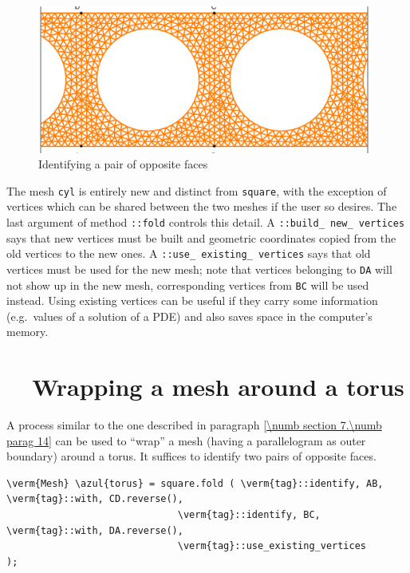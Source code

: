 \begin{figure}[ht] \centering
  \includegraphics[width=110mm]{cylinder-1.eps}
  \caption{Identifying a pair of opposite faces}
  \label{\numb section 7.\numb fig 10}
\end{figure}

The mesh {\small\tt cyl} is entirely new and distinct from {\small\tt square},
with the exception of vertices which can be shared between the two meshes if the
user so desires.
The last argument of method {\small\tt{}::fold} controls this detail.
A {\small\tt{}::build\_\,new\_\,vertices} says that new vertices must be built
and geometric coordinates copied from the old vertices to the new ones.
A {\small\tt{}::use\_\,existing\_\,vertices} says that old vertices must be used
for the new mesh; note that vertices belonging to {\small\tt DA} will not show up in the
new mesh, corresponding vertices from {\small\tt BC} will be used instead.
Using existing vertices can be useful if they carry some information (e.g.\ values
of a solution of a PDE) and also saves space in the computer's memory.


\section{~~Wrapping a mesh around a torus}\label{\numb section 7.\numb parag 15}

A process similar to the one described in paragraph \ref{\numb section 7.\numb parag 14}
can be used to ``wrap'' a mesh (having a parallelogram as outer boundary) around
a torus.
It suffices to identify two pairs of opposite faces.

\begin{Verbatim}[commandchars=\\\{\},formatcom=\small\tt,frame=single,
   label=parag-\ref{\numb section 7.\numb parag 15}.cpp,rulecolor=\color{coment},
   baselinestretch=0.94,framesep=2mm                                             ]
   \verm{Mesh} \azul{torus} = square.fold ( \verm{tag}::identify, AB, \verm{tag}::with, CD.reverse(),
                              \verm{tag}::identify, BC, \verm{tag}::with, DA.reverse(),
                              \verm{tag}::use_existing_vertices                 );
\end{Verbatim}



